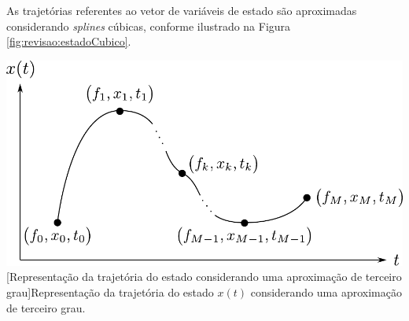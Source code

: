 As trajetórias referentes ao vetor de variáveis de estado são aproximadas considerando \textit{splines} cúbicas, conforme ilustrado na Figura \ref{fig:revisao:estadoCubico}. 

\noindent	
\begin{minipage}{\textwidth}
	\vspace{\onelineskip}
	\centering
	\includegraphics[width=0.8\linewidth]{draw/revisao/pdf/estadoCubico}
	[Representação da trajetória do estado considerando uma aproximação de terceiro grau]{Representação da trajetória do estado $ x(t) $ considerando uma aproximação de terceiro grau.}
	\label{fig:revisao:estadoCubico}
	\vspace{\onelineskip}
\end{minipage}

